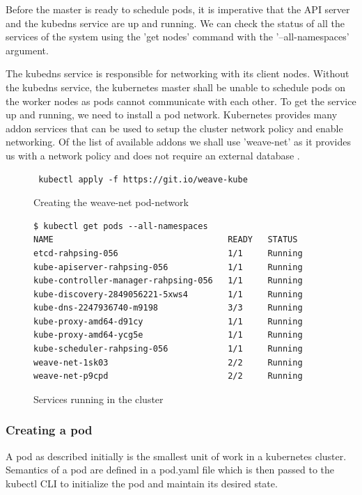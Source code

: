 \documentclass[9pt,twocolumn,twoside]{../../styles/osajnl}
\begin{document}
{\noindent
Before the master is ready to schedule pods, it is imperative that the
API server and the kubedns service are up and running. We can check
the status of all the services of the system using the
'get nodes' command with the '--all-namespaces' argument.

\noindent
The kubedns service is responsible for networking with its client
nodes. Without the kubedns service, the kubernetes master shall be
unable to schedule pods on the worker nodes as pods cannot communicate
with each other. To get the service up and running, we need to install
a pod network. Kubernetes provides many addon services that can be
used to setup the cluster network policy and enable networking. Of the
list of available addons we shall use 'weave-net' as it provides us
with a network policy and does not require an external database
\cite{www-kubernetes-addons}.

\begin{figure}[H]
\begin{verbatim}
 kubectl apply -f https://git.io/weave-kube
\end{verbatim}
\caption{Creating the weave-net pod-network}
\label{Creating the weave-net pod-network}
\end{figure}

\begin{figure}[H]
\begin{verbatim}
$ kubectl get pods --all-namespaces
NAME                                   READY   STATUS       
etcd-rahpsing-056                      1/1     Running          
kube-apiserver-rahpsing-056            1/1     Running           
kube-controller-manager-rahpsing-056   1/1     Running           
kube-discovery-2849056221-5xws4        1/1     Running         
kube-dns-2247936740-m9198              3/3     Running           
kube-proxy-amd64-d91cy                 1/1     Running           
kube-proxy-amd64-ycg5e                 1/1     Running           
kube-scheduler-rahpsing-056            1/1     Running           
weave-net-1sk03                        2/2     Running           
weave-net-p9cpd                        2/2     Running           
\end{verbatim}
\caption{Services running in the cluster}
\label{Services running in the cluster}
\end{figure}

\subsubsection{Creating a pod}
A pod as described initially is the smallest unit of work in a
kubernetes cluster. Semantics of a pod are defined in a pod.yaml file
which is then passed to the kubectl CLI to initialize the pod and
maintain its desired state.

}
\end{document}
